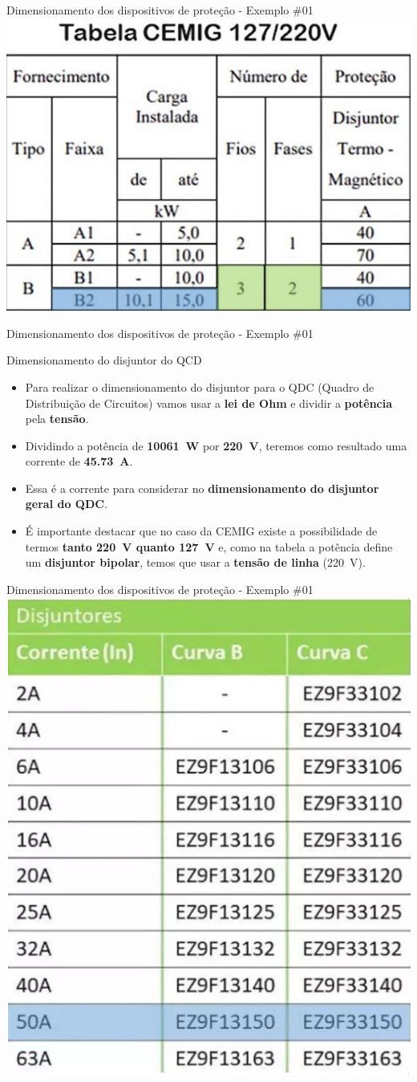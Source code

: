 \begin{frame}{Dimensionamento dos dispositivos de proteção - Exemplo \#01}
	\centering
	\includegraphics[width=0.8\linewidth]{Figuras/Ch06/fig13}
\end{frame}


\begin{frame}{Dimensionamento dos dispositivos de proteção - Exemplo \#01}
	\begin{block}{Dimensionamento do disjuntor do QCD}
		\begin{itemize}
			\item Para realizar o dimensionamento do disjuntor para o QDC (Quadro de Distribuição de Circuitos) vamos usar a \textbf{lei de Ohm} e dividir a \textbf{potência} pela \textbf{tensão}.
			\item Dividindo a potência de \textbf{\SI{10061}{\watt}} por \textbf{\SI{220}{\volt}}, teremos como resultado uma corrente de \textbf{\SI{45.73}{\ampere}}.
			\item Essa é a corrente para considerar no \textbf{dimensionamento do disjuntor geral do QDC}.
			\item É importante destacar que no caso da CEMIG existe a possibilidade de termos \textbf{tanto \SI{220}{\volt} quanto \SI{127}{\volt}} e, como na tabela a potência define um \textbf{disjuntor bipolar}, temos que usar a \textbf{tensão de linha} (\SI{220}{\volt}).
		\end{itemize}
	\end{block}
\end{frame}


\begin{frame}{Dimensionamento dos dispositivos de proteção - Exemplo \#01}
	\centering
	\includegraphics[width=0.5\linewidth]{Figuras/Ch06/fig14}
\end{frame}



